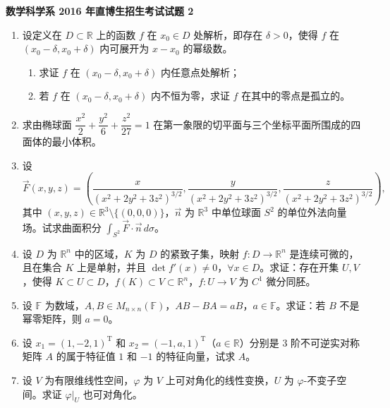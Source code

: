 \documentclass[UTF8,11pt,fontset=none]{ctexart}
\newcommand{\paperheading}[1]{\begin{center}\Large\bfseries #1\end{center}\vspace{.45em}}
\newcommand{\newpaper}[1]{\clearpage\paperheading{#1}}
\begin{document}
\newpaper{数学科学系 2016 年直博生招生考试试题 2}
\begin{enumerate}
\item 设定义在 $D\subset\mathbb R$ 上的函数 $f$ 在 $x_0\in D$ 处解析，即存在 $\delta>0$，使得 $f$ 在 $(x_0-\delta,x_0+\delta)$ 内可展开为 $x-x_0$ 的幂级数。
\begin{enumerate}
\item 求证 $f$ 在 $(x_0-\delta,x_0+\delta)$ 内任意点处解析；
\item 若 $f$ 在 $(x_0-\delta,x_0+\delta)$ 内不恒为零，求证 $f$ 在其中的零点是孤立的。
\end{enumerate}
\item 求由椭球面 $\dfrac{x^2}{2}+\dfrac{y^2}{6}+\dfrac{z^2}{27}=1$ 在第一象限的切平面与三个坐标平面所围成的四面体的最小体积。
\item 设
\[
\vec F(x,y,z)=
\left(
\frac{x}{(x^2+2y^2+3z^2)^{3/2}},
\frac{y}{(x^2+2y^2+3z^2)^{3/2}},
\frac{z}{(x^2+2y^2+3z^2)^{3/2}}
\right),
\]
其中 $(x,y,z)\in\mathbb R^3\setminus\{(0,0,0)\}$，$\vec n$ 为 $\mathbb R^3$ 中单位球面 $S^2$ 的单位外法向量场。试求曲面积分 $\displaystyle\int_{S^2}\vec F\cdot\vec n\,d\sigma$。
\item 设 $D$ 为 $\mathbb R^n$ 中的区域，$K$ 为 $D$ 的紧致子集，映射 $f:D\to\mathbb R^n$ 是连续可微的，且在集合 $K$ 上是单射，并且 $\det f'(x)\ne0$，$\forall x\in D$。求证：存在开集 $U,V$，使得 $K\subset U\subset D$，$f(K)\subset V\subset\mathbb R^n$，$f:U\to V$ 为 $C^1$ 微分同胚。
\item 设 $\mathbb F$ 为数域，$A,B\in M_{n\times n}(\mathbb F)$，$AB-BA=aB$，$a\in\mathbb F$。求证：若 $B$ 不是幂零矩阵，则 $a=0$。
\item 设 $x_1=(1,-2,1)^{\mathrm T}$ 和 $x_2=(-1,a,1)^{\mathrm T}$（$a\in\mathbb R$）分别是 3 阶不可逆实对称矩阵 $A$ 的属于特征值 $1$ 和 $-1$ 的特征向量，试求 $A$。
\item 设 $V$ 为有限维线性空间，$\varphi$ 为 $V$ 上可对角化的线性变换，$U$ 为 $\varphi$-不变子空间。求证 $\varphi|_U$ 也可对角化。
\end{enumerate}
\end{document}
